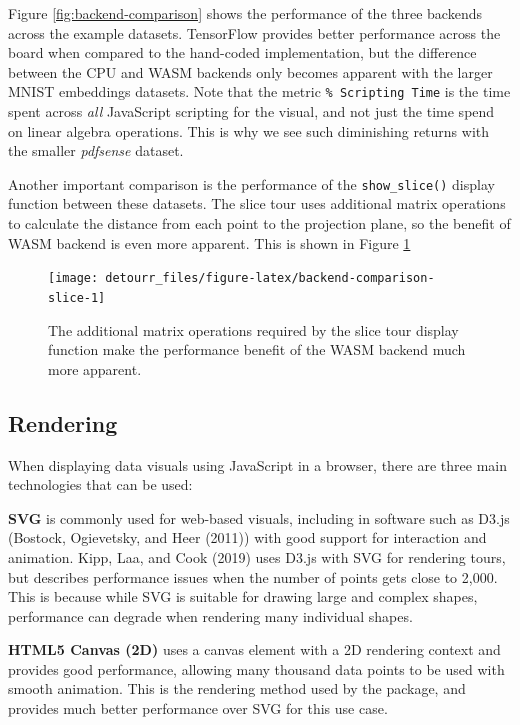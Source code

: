 Figure \ref{fig:backend-comparison} shows the performance of the three backends across the example datasets. TensorFlow provides better performance across the board when compared to the hand-coded implementation, but the difference between the CPU and WASM backends only becomes apparent with the larger MNIST embeddings datasets. Note that the metric \texttt{\%\ Scripting\ Time} is the time spent across \emph{all} JavaScript scripting for the visual, and not just the time spend on linear algebra operations. This is why we see such diminishing returns with the smaller \emph{pdfsense} dataset.

Another important comparison is the performance of the \texttt{show\_slice()} display function between these datasets. The slice tour uses additional matrix operations to calculate the distance from each point to the projection plane, so the benefit of WASM backend is even more apparent. This is shown in Figure \ref{fig:backend-comparison-slice}

\begin{figure}

{\centering \texttt{[image: detourr\_files/figure-latex/backend-comparison-slice-1]} 

}

\caption{The additional matrix operations required by the slice tour display function make the performance benefit of the WASM backend much more apparent.}\label{fig:backend-comparison-slice}
\end{figure}

\hypertarget{rendering}{%
\subsection{Rendering}\label{rendering}}

When displaying data visuals using JavaScript in a browser, there are three main technologies that can be used:

\textbf{SVG} is commonly used for web-based visuals, including in software such as D3.js (Bostock, Ogievetsky, and Heer (2011)) with good support for interaction and animation. Kipp, Laa, and Cook (2019) uses D3.js with SVG for rendering tours, but describes performance issues when the number of points gets close to 2,000. This is because while SVG is suitable for drawing large and complex shapes, performance can degrade when rendering many individual shapes.

\textbf{HTML5 Canvas (2D)} uses a canvas element with a 2D rendering context and provides good performance, allowing many thousand data points to be used with smooth animation. This is the rendering method used by the  package, and provides much better performance over SVG for this use case.

